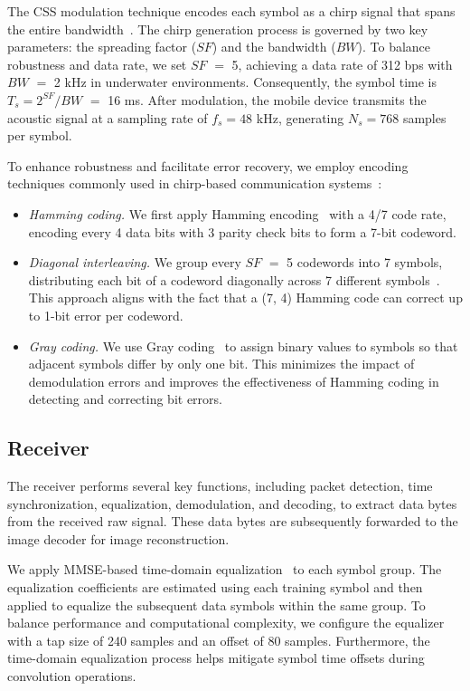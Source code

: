 The CSS modulation technique encodes each symbol as a chirp signal that spans the entire bandwidth~\cite{TSN23,jung2021exploiting}. The chirp generation process is governed by two key parameters: the spreading factor ($SF$) and the bandwidth ($BW$).
To balance robustness and data rate, we set $SF$ $=$ 5,
achieving a data rate of 312 bps with $BW$ $=$ 2 kHz in underwater environments.
Consequently, the symbol time is $T_{s} = 2^{SF} / BW$ $=$ 16 ms.
After modulation, the mobile device transmits the acoustic signal at a sampling rate of
$f_{s} = 48$ kHz, generating $N_{s} = 768$ samples per symbol.




To enhance robustness and facilitate error recovery,
we employ encoding techniques commonly used in chirp-based communication systems~\cite {TSN23,LoRaWAN,chen2024hitting}:

\begin{itemize}[leftmargin=*]
    \item \textit{Hamming coding.} We first apply Hamming encoding~\cite{hamming1986coding} with a 4/7 code rate, encoding every 4 data bits with 3 parity check bits to form a 7-bit codeword.
    \item \textit{Diagonal interleaving.} We group every $SF$ $=$ 5 codewords into 7 symbols,
    distributing each bit of a codeword diagonally across 7 different
    symbols~\cite{TSN23}.
    This approach aligns with the fact that a (7, 4) Hamming code can correct up to 1-bit error per codeword.
    \item \textit{Gray coding.} %
    We use Gray coding~\cite{doran2007gray} to assign binary values to symbols so that adjacent
    symbols differ by only one bit. This minimizes the impact of demodulation errors
    and improves the effectiveness of Hamming coding in detecting and correcting bit errors.
\end{itemize}


\subsection{Receiver}
The receiver performs several key functions, including packet detection,
time synchronization, equalization, demodulation, and decoding,
to extract data bytes from the received raw signal.
These data bytes are subsequently forwarded to the image decoder for image
reconstruction.

We apply MMSE-based time-domain equalization~\cite{MMSE} to each symbol group.
The equalization coefficients are estimated using each training symbol and then
applied to equalize the subsequent data symbols within the same group.
To balance performance and computational complexity,
we configure the equalizer with a tap size of 240 samples and an offset of 80 samples.
Furthermore, the time-domain equalization process helps mitigate symbol time
offsets during convolution operations.

